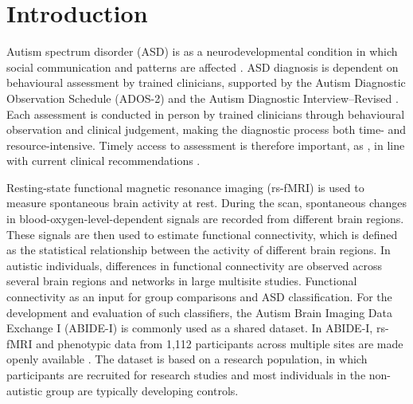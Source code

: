 \section{Introduction}
\label{sec:introduction}

Autism spectrum disorder (ASD) is  as a neurodevelopmental condition in which social communication and  patterns are affected \citep{Maenneretal2023}. ASD diagnosis is dependent on behavioural
assessment by trained clinicians, supported by the Autism Diagnostic Observation Schedule (ADOS-2)
\citep{Lordetal2000} and the Autism Diagnostic Interview--Revised \citep{Lordetal1994}.
Each assessment is conducted in person by trained clinicians through behavioural observation and clinical judgement, making the diagnostic process both time- and resource-intensive. Timely access to assessment is therefore important, as , in line with current clinical recommendations \citep{Zwaigenbaumetal2015}. 


Resting-state functional magnetic resonance imaging (rs-fMRI) is used to measure spontaneous brain activity at rest. During the scan, spontaneous changes in blood-oxygen-level-dependent signals are recorded from different brain regions. These signals are then used to estimate functional connectivity, which is defined as the statistical relationship between the activity of different brain regions. In autistic individuals, differences in functional connectivity are observed across several brain regions and networks in large multisite studies. Functional connectivity  as an input for group comparisons and ASD classification. For the development and evaluation of such classifiers, the Autism Brain Imaging Data Exchange I (ABIDE-I) is commonly used as a shared dataset. In ABIDE-I, rs-fMRI and phenotypic data from 1,112 participants across multiple sites are made openly available \citep{DiMartinoetal2014}. The dataset is based on a research population, in which participants are recruited for research studies and most individuals in the non-autistic group are typically developing controls.


